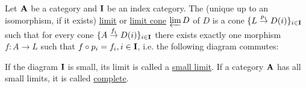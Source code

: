 \begin{definition}\label{def:categorical_limit}\cite[definitions 5.1.19(b), definition 6.3.6]{Leinster2014}
  Let $\operatorname{\mathbf{A}}$ be a category and $\operatorname{\mathbf{I}}$ be an index category. The (unique up to an isomorphism, if it exists) \ul{limit} or \ul{limit cone} $\varprojlim D$ of $D$ is a cone $\{ L \overset {p_i} \to D(i) \}_{i \in \operatorname{\mathbf{I}}}$ such that for every cone $\{ A \overset {f_i} \to D(i) \}_{i \in \operatorname{\mathbf{I}}}$ there exists exactly one morphism $f: A \to L$ such that $f \circ p_i = f_i, i \in \operatorname{\mathbf{I}}$, i.e. the following diagram commutes:
  \begin{Center}
  \end{Center}

  If the diagram $\operatorname{\mathbf{I}}$ is small, its limit is called a \ul{small limit}. If a category $\operatorname{\mathbf{A}}$ has all small limits, it is called \ul{complete}.
\end{definition}

